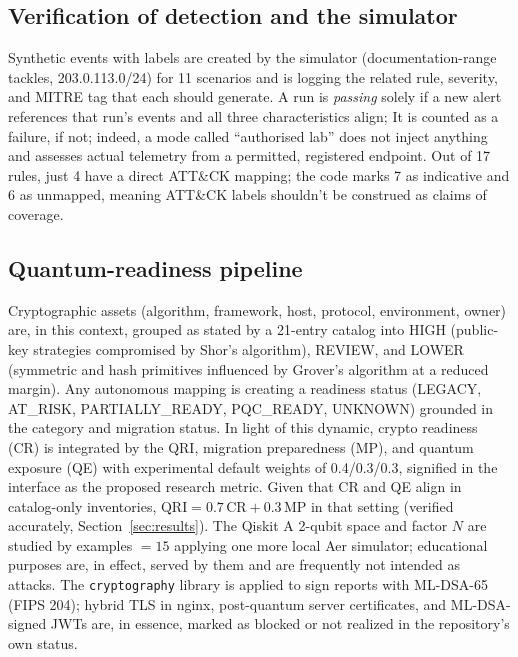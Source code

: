 \documentclass[conference]{IEEEtran}
\newcommand{\code}[1]{\texttt{#1}}
\begin{document}
\subsection{Verification of detection and the simulator}
Synthetic events with labels are created by the simulator (documentation-range tackles, 203.0.113.0/24) for 11 scenarios and is logging the related rule, severity, and MITRE tag that each should generate. A run is \emph{passing} solely if a new alert references that run's events and all three characteristics align; It is counted as a failure, if not; indeed, a mode called ``authorised lab'' does not inject anything and assesses actual telemetry from a permitted, registered endpoint. Out of 17 rules, just 4 have a direct ATT\&CK mapping; the code marks 7 as indicative and 6 as unmapped, meaning ATT\&CK labels shouldn't be construed as claims of coverage.

\subsection{Quantum-readiness pipeline}
Cryptographic assets (algorithm, framework, host, protocol, environment, owner) are, in this context, grouped as stated by a 21-entry catalog into HIGH (public-key strategies compromised by Shor's algorithm), REVIEW, and LOWER (symmetric and hash primitives influenced by Grover's algorithm at a reduced margin). Any autonomous mapping is creating a readiness status (LEGACY, AT\_RISK, PARTIALLY\_READY, PQC\_READY, UNKNOWN) grounded in the category and migration status. In light of this dynamic, crypto readiness (CR) is integrated by the QRI, migration preparedness (MP), and quantum exposure (QE) with experimental default weights of 0.4/0.3/0.3, signified in the interface as the proposed research metric. Given that CR and QE align in catalog-only inventories, $\mathrm{QRI}=0.7\,\mathrm{CR}+0.3\,\mathrm{MP}$ in that setting (verified accurately, Section~\ref{sec:results}). The Qiskit A 2-qubit space and factor $N$ are studied by examples $=15$ applying one more local Aer simulator; educational purposes are, in effect, served by them and are frequently not intended as attacks. The \code{cryptography} library is applied to sign reports with ML-DSA-65 (FIPS 204); hybrid TLS in nginx, post-quantum server certificates, and ML-DSA-signed JWTs are, in essence, marked as blocked or not realized in the repository's own status.
\end{document}
